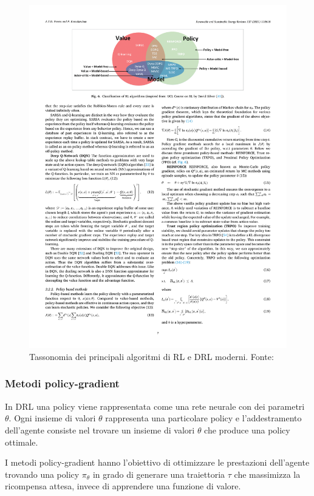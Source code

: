 \begin{figure}
    \centering
    \includegraphics[width=\linewidth]{assets/2/rl_algorithm_taxonomy.pdf}
    \caption[Tassonomia dei principali algoritmi di RL e DRL moderni]{Tassonomia  dei principali algoritmi di RL e DRL moderni. Fonte: \cite{Perera2021}}
    \label{fig:2_rl_algorithm_taxonomy}
\end{figure}

\subsubsection{Metodi policy-gradient}

In DRL una policy viene rappresentata come una rete neurale con dei parametri $\theta$. Ogni insieme di valori $\theta$ rappresenta una particolare policy e l'addestramento dell'agente consiste nel trovare un insieme di valori $\theta$ che produce una policy ottimale.

I metodi policy-gradient hanno l'obiettivo di ottimizzare le prestazioni dell'agente trovando una policy $\pi_\theta$ in grado di generare una traiettoria $\tau$ che massimizza la ricompensa attesa, invece di apprendere una funzione di valore.

